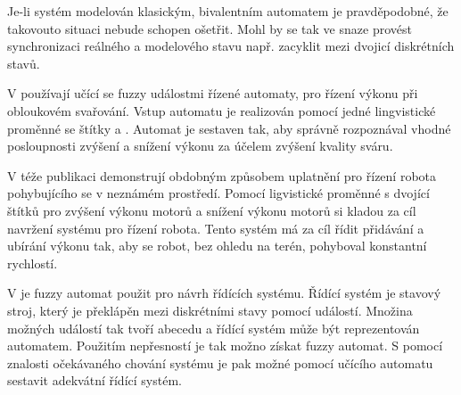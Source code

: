 \documentclass[a4paper,10pt]{article}
\begin{document}
Je-li systém modelován klasickým, bivalentním automatem  je pravděpodobné, že takovouto situaci nebude schopen ošetřit. Mohl by se tak ve snaze provést synchronizaci reálného a modelového stavu např. zacyklit mezi dvojicí diskrétních stavů.  


V \cite{TzaRig-StaAnaAdaFuzzConSysUsiPetrNetLeaAut} používají učící se fuzzy událostmi řízené automaty, pro řízení výkonu při obloukovém svařování. Vstup automatu je realizován pomocí jedné lingvistické proměnné se štítky  a . Automat je sestaven tak, aby správně rozpoznával vhodné posloupnosti zvýšení a snížení výkonu za účelem zvýšení kvality sváru. 

V téže publikaci demonstrují obdobným způsobem uplatnění pro řízení robota pohybujícího se v neznámém prostředí. Pomocí ligvistické proměnné s dvojící štítků pro zvýšení výkonu motorů a snížení výkonu motorů si kladou za cíl navržení systému pro řízení robota. Tento systém má za cíl řídit přidávání a ubírání výkonu tak, aby se robot, bez ohledu na terén, pohyboval konstantní rychlostí.

V \cite{WeeFu-FormFuzAutAppModLeaSys} je fuzzy automat použit pro návrh řídících systému. Řídící systém je stavový stroj, který je překlápěn mezi diskrétními stavy pomocí událostí. Množina možných událostí tak tvoří abecedu a řídící systém může být reprezentován automatem. Použitím nepřesností je tak možno získat fuzzy automat.  S pomocí znalosti očekávaného chování systému je pak možné pomocí učícího automatu sestavit adekvátní řídící systém.





\end{document}
